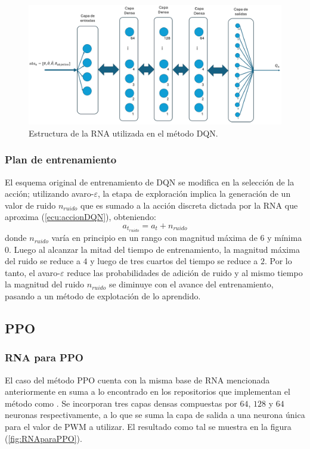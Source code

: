 \begin{figure}[hh]
	\centering
	\includegraphics[scale=0.38]{fig/new/RNADQN.png}
	\caption{Estructura de la RNA utilizada en el método DQN.}
	\label{fig:RNAparaDQN}
\end{figure}

\subsubsection{Plan de entrenamiento}

El esquema original de entrenamiento de DQN se modifica en la selección de la acción; utilizando avaro-$\varepsilon$, la etapa de exploración implica la generación de un valor de ruido $n_{ruido}$ que es sumado a la acción discreta dictada por la RNA que aproxima (\ref{ecu:accionDQN}), obteniendo:
\begin{equation}
a_{t_{ruido}} = a_t + n_{ruido}
\end{equation}
donde $n_{ruido}$ varía en principio en un rango con magnitud máxima de $6$ y mínima $0$. Luego al alcanzar la mitad del tiempo de entrenamiento, la magnitud máxima del ruido se reduce a $4$ y luego de tres cuartos del tiempo se reduce a $2$. Por lo tanto, el avaro-$\varepsilon$ reduce las probabilidades de adición de ruido y al mismo tiempo la magnitud del ruido $n_{ruido}$ se diminuye con el avance del entrenamiento, pasando a un método de explotación de lo aprendido.

\subsection{PPO}

\subsubsection{RNA para PPO}

El caso del método PPO cuenta con la misma base de RNA mencionada anteriormente en suma a lo encontrado en los repositorios que implementan el método como \cite{PPOcoding}. Se incorporan tres capas densas compuestas por $64$, $128$ y $64$ neuronas respectivamente, a lo que se suma la capa de salida a una neurona única para el valor de PWM a utilizar. El resultado como tal se muestra en la figura (\ref{fig:RNAparaPPO}).

